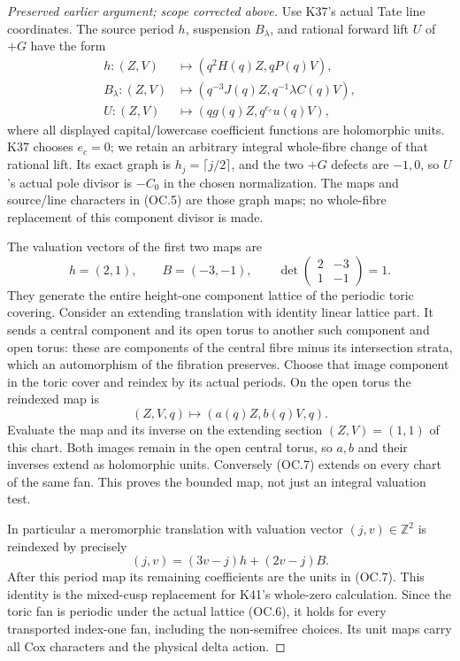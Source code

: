 \begin{proof}[Preserved earlier argument; scope corrected above]
Use K37's actual Tate line coordinates. The source period \(h\),
suspension \(B_\lambda\), and rational forward lift \(U\)
of \(+G\) have the form
\[
 \begin{aligned}
 h:(Z,V)&\longmapsto(q^2H(q)Z,qP(q)V),\\
 B_\lambda:(Z,V)&\longmapsto(q^{-3}J(q)Z,
                                      q^{-1}\lambda C(q)V),\\
 U:(Z,V)&\longmapsto(qg(q)Z,q^{e_c}u(q)V),
 \end{aligned}                                             \tag{OC.5}
\]
where all displayed capital/lowercase coefficient functions are
holomorphic units. K37 chooses \(e_c=0\); we retain an arbitrary
integral whole-fibre change of that rational lift. Its exact graph is
\(h_j=\lceil j/2\rceil\), and the two \(+G\) defects are
\(-1,0\), so \(U\)'s actual pole divisor is \(-C_0\)
in the chosen normalization. The maps and source/line characters
in (OC.5) are those graph maps; no whole-fibre replacement of this
component divisor is made.

The valuation vectors of the first two maps are
\[
                   h=(2,1),\qquad B=(-3,-1),\qquad
             \det\begin{pmatrix}2&-3\\1&-1\end{pmatrix}=1.
                                                               \tag{OC.6}
\]
They generate the entire height-one component lattice of the
periodic toric covering. Consider an extending translation with
identity linear lattice part. It sends a central component and its
open torus to another such component and open torus: these are
components of the central fibre minus its intersection strata, which
an automorphism of the fibration preserves. Choose that image
component in the toric cover and reindex by its actual periods. On
the open torus the reindexed map is
\[
                    (Z,V,q)\longmapsto(a(q)Z,b(q)V,q).     \tag{OC.7}
\]
Evaluate the map and its inverse on the extending section
\((Z,V)=(1,1)\) of this chart. Both images remain in the open
central torus, so \(a,b\) and their inverses extend as
holomorphic units. Conversely (OC.7) extends on every chart of
the same fan. This proves the bounded map, not just an integral
valuation test.

In particular a meromorphic translation with valuation vector
\((j,v)\in\mathbb Z^2\) is reindexed by precisely
\[
       (j,v)=(3v-j)h+(2v-j)B.                             \tag{OC.8}
\]
After this period map its remaining coefficients are the units in
(OC.7). This identity is the mixed-cusp replacement for K41's
whole-zero calculation. Since the toric fan is periodic under the
actual lattice (OC.6), it holds for every transported index-one fan,
including the non-semifree choices. Its unit maps carry all Cox
characters and the physical delta action.


\end{proof}

